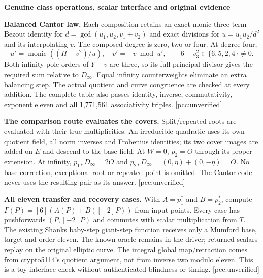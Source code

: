 \documentclass[10pt,a4paper]{article}
\begin{document}
\newpage
{\Large\bfseries Genuine class operations, scalar interface and original evidence}\par

\textbf{Balanced Cantor law.} Each composition retains an exact monic
three-term Bezout identity for $d=\gcd(u_1,u_2,v_1+v_2)$ and exact
divisions for $u=u_1u_2/d^2$ and its interpolating $v$. The composed
degree is zero, two or four. At degree four,
\[
u'=\operatorname{monic}((H-v^2)/u),\quad v'=-v\bmod u',\qquad
6-v_3^2\in\{6,5,2,4\}\ne0.
\]
Both infinity pole orders of $Y-v$ are three, so its full principal
divisor gives the required sum relative to $D_\infty$. Equal infinity
counterweights eliminate an extra balancing step. The actual quotient
and curve congruence are checked at every addition. The complete table
also passes identity, inverse, commutativity, exponent eleven and all
1,771,561 associativity triples. [pcc:unverified]

\textbf{The comparison route evaluates the covers.} Split/repeated roots
are evaluated with their true multiplicities. An irreducible quadratic
uses its own quotient field, all norm inverses and Frobenius identities;
its two cover images are added on $E$ and descend to the base field.
At $W=0$, $p_2=O$ through its proper extension. At infinity,
$p_{1*}D_\infty=2O$ and $p_{2*}D_\infty=(0,\eta)+(0,-\eta)=O$.
No base correction, exceptional root or repeated point is omitted.
The Cantor code never uses the resulting pair as its answer.
[pcc:unverified]

\textbf{All eleven transfer and recovery cases.} With $A=p_1^*$ and
$B=p_2^*$, compute $\Gamma(P)=[6](A(P)+B([-2]P))$ from input points.
Every case has pushforwards $(P,[-2]P)$ and commutes with scalar
multiplication from $T$. The existing Shanks baby-step giant-step
function receives only a Mumford base, target and order eleven. The
known oracle remains in the driver; returned scalars replay on the
original elliptic curve. The integral global map/retraction comes from
crypto5114's quotient argument, not from inverse two modulo eleven.
This is a toy interface check without authenticated blindness or timing.
[pcc:unverified]
\end{document}
